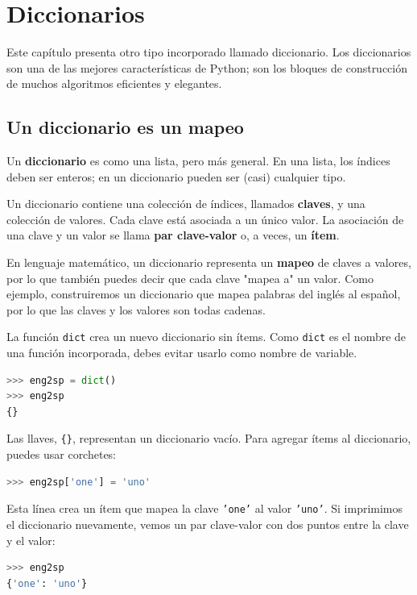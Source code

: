 \chapter{Diccionarios}

Este capítulo presenta otro tipo incorporado llamado diccionario. Los diccionarios son una de las mejores características de Python; son los bloques de construcción de muchos algoritmos eficientes y elegantes.

\section{Un diccionario es un mapeo}

Un \textbf{diccionario} es como una lista, pero más general. En una lista, los índices deben ser enteros; en un diccionario pueden ser (casi) cualquier tipo.

Un diccionario contiene una colección de índices, llamados \textbf{claves}, y una colección de valores. Cada clave está asociada a un único valor. La asociación de una clave y un valor se llama \textbf{par clave-valor} o, a veces, un \textbf{ítem}.

En lenguaje matemático, un diccionario representa un \textbf{mapeo} de claves a valores, por lo que también puedes decir que cada clave "mapea a" un valor. Como ejemplo, construiremos un diccionario que mapea palabras del inglés al español, por lo que las claves y los valores son todas cadenas.

La función \texttt{dict} crea un nuevo diccionario sin ítems. Como \texttt{dict} es el nombre de una función incorporada, debes evitar usarlo como nombre de variable.

\begin{lstlisting}[language=Python]
>>> eng2sp = dict()
>>> eng2sp
{}
\end{lstlisting}

Las llaves, \texttt{\{\}}, representan un diccionario vacío. Para agregar ítems al diccionario, puedes usar corchetes:

\begin{lstlisting}[language=Python]
>>> eng2sp['one'] = 'uno'
\end{lstlisting}

Esta línea crea un ítem que mapea la clave \texttt{'one'} al valor \texttt{'uno'}. Si imprimimos el diccionario nuevamente, vemos un par clave-valor con dos puntos entre la clave y el valor:

\begin{lstlisting}[language=Python]
>>> eng2sp
{'one': 'uno'}
\end{lstlisting}

